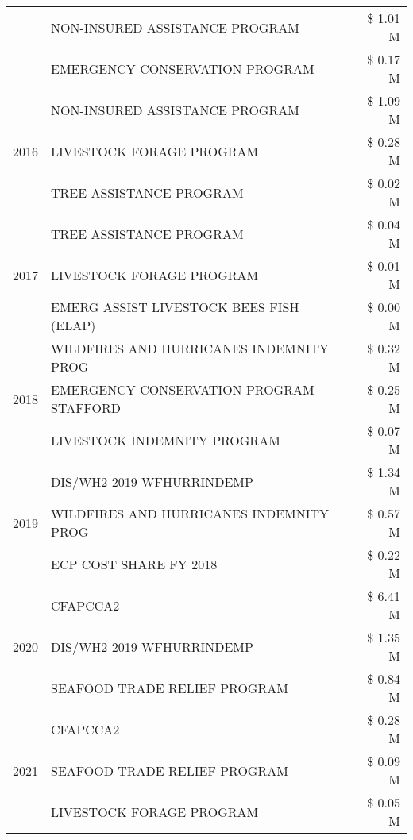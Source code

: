 \begin{tabular}{llr}
 & NON-INSURED ASSISTANCE PROGRAM & \$ 1.01 M \\
 & EMERGENCY CONSERVATION PROGRAM & \$ 0.17 M \\
\cline{1-3}
\multirow[t]{3}{*}{2016} & NON-INSURED ASSISTANCE PROGRAM                & \$ 1.09 M \\
 & LIVESTOCK FORAGE PROGRAM                      & \$ 0.28 M \\
 & TREE ASSISTANCE PROGRAM                       & \$ 0.02 M \\
\cline{1-3}
\multirow[t]{3}{*}{2017} & TREE ASSISTANCE PROGRAM & \$ 0.04 M \\
 & LIVESTOCK FORAGE PROGRAM & \$ 0.01 M \\
 & EMERG ASSIST LIVESTOCK BEES FISH (ELAP) & \$ 0.00 M \\
\cline{1-3}
\multirow[t]{3}{*}{2018} & WILDFIRES AND HURRICANES INDEMNITY PROG & \$ 0.32 M \\
 & EMERGENCY CONSERVATION PROGRAM STAFFORD & \$ 0.25 M \\
 & LIVESTOCK INDEMNITY PROGRAM & \$ 0.07 M \\
\cline{1-3}
\multirow[t]{3}{*}{2019} & DIS/WH2 2019 WFHURRINDEMP & \$ 1.34 M \\
 & WILDFIRES AND HURRICANES INDEMNITY PROG & \$ 0.57 M \\
 & ECP COST SHARE FY 2018 & \$ 0.22 M \\
\cline{1-3}
\multirow[t]{3}{*}{2020} & CFAPCCA2 & \$ 6.41 M \\
 & DIS/WH2 2019 WFHURRINDEMP & \$ 1.35 M \\
 & SEAFOOD TRADE RELIEF PROGRAM & \$ 0.84 M \\
\cline{1-3}
\multirow[t]{3}{*}{2021} & CFAPCCA2 & \$ 0.28 M \\
 & SEAFOOD TRADE RELIEF PROGRAM & \$ 0.09 M \\
 & LIVESTOCK FORAGE PROGRAM & \$ 0.05 M \\
\cline{1-3}
\bottomrule
\end{tabular}
